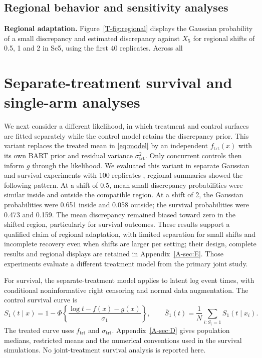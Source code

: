 \documentclass[11pt]{article}
\theoremstyle{remark}\newtheorem{remark}{Remark}[section]
\providecommand{\DIFaddtex}[1]{{\protect\color{blue} \sf #1}} %
\providecommand{\DIFdeltex}[1]{{\protect\color{red} \scriptsize #1}} %
\providecommand{\DIFaddbegin}{} %
\providecommand{\DIFaddend}{} %
\providecommand{\DIFdelbegin}{} %
\providecommand{\DIFdelend}{} %
\providecommand{\DIFadd}[1]{\texorpdfstring{\DIFaddtex{#1}}{#1}} %
\providecommand{\DIFdel}[1]{\texorpdfstring{\DIFdeltex{#1}}{}} %
\begin{document}
\DIFdelbegin \subsection{\DIFdel{Regional behavior and sensitivity analyses}}
\addtocounter{subsection}{-1}%
\DIFdel{\textbf{Regional adaptation.}
Figure~\ref{T-fig:regional} displays the Gaussian probability of a small discrepancy and estimated discrepancy against $X_5$ for regional shifts of 0.5, 1 and 2 in Sc5, using the first 40 replicates. Across all }\DIFdelend \DIFaddbegin \section{\DIFadd{Separate-treatment survival and single-arm analyses}}\label{sec:variant}
\DIFadd{We next consider a different likelihood, in which treatment and control surfaces are fitted separately while the control model retains the discrepancy prior. This variant replaces the treated mean in \eqref{eq:model} by an independent $f_{\mathrm{trt}}(x)$ with its own BART prior and residual variance $\sigma_{\mathrm{trt}}^2$. Only concurrent controls then inform $g$ through the likelihood. We evaluated this variant in separate Gaussian and survival experiments with }\DIFaddend 100 replicates \DIFdelbegin \DIFdel{, regional summaries showed the following pattern. At a shift of 0.5, mean small-discrepancy probabilities were similar inside and outside the compatible region.
At a shift of 2, the Gaussian probabilities were 0.651 inside and 0.058 outside; the survival probabilities were 0.473 and 0.159. The mean discrepancy remained biased toward zero in the shifted region, particularly for survival outcomes. These results support a qualified claim of regional adaptation, with limited separation for small shifts and incomplete recovery even when shifts are larger}\DIFdelend \DIFaddbegin \DIFadd{per setting; their design, complete results and regional displays are retained in Appendix~\ref{A-sec:E}. Those experiments evaluate a different treatment model from the primary joint study.
}

\DIFadd{For survival, the separate-treatment model applies to latent log event times, with conditional noninformative right censoring and normal data augmentation. The control survival curve is
}\begin{equation}\label{eq:survival}
S_1(t\mid x)=1-\Phi\!\left\{\frac{\log t-f(x)-g(x)}{\sigma_1}\right\},\qquad
\bar S_1(t)=\frac{1}N\sum_{i:S_i=1}S_1(t\mid x_i).
\end{equation}
\DIFadd{The treated curve uses $f_{\mathrm{trt}}$ and $\sigma_{\mathrm{trt}}$. Appendix~\ref{A-sec:D} gives population medians, restricted means and the numerical conventions used in the survival simulations. No joint-treatment survival analysis is reported here}\DIFaddend .
\end{document}
